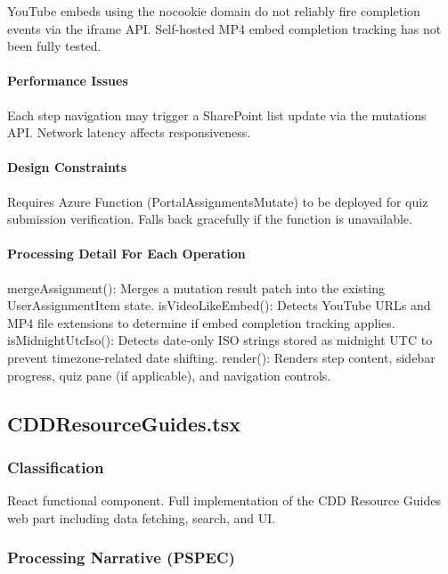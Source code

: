 \documentclass[12pt]{article}
\begin{document}
YouTube embeds using the nocookie domain do not reliably fire completion events via the iframe API. Self-hosted MP4 embed completion tracking has not been fully tested.

\paragraph{Performance Issues}

Each step navigation may trigger a SharePoint list update via the mutations API. Network latency affects responsiveness.

\paragraph{Design Constraints}

Requires Azure Function (PortalAssignmentsMutate) to be deployed for quiz submission verification. Falls back gracefully if the function is unavailable.

\paragraph{Processing Detail For Each Operation}

mergeAssignment(): Merges a mutation result patch into the existing UserAssignmentItem state. isVideoLikeEmbed(): Detects YouTube URLs and MP4 file extensions to determine if embed completion tracking applies. isMidnightUtcIso(): Detects date-only ISO strings stored as midnight UTC to prevent timezone-related date shifting. render(): Renders step content, sidebar progress, quiz pane (if applicable), and navigation controls.

\subsection{CDDResourceGuides.tsx}

\subsubsection{Classification}

React functional component. Full implementation of the CDD Resource Guides web part including data fetching, search, and UI.

\subsubsection{Processing Narrative (PSPEC)}
\end{document}
